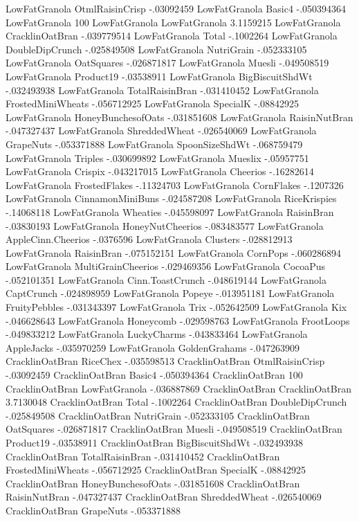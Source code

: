 LowFatGranola	OtmlRaisinCrisp	-.03092459
LowFatGranola	Basic4	-.050394364
LowFatGranola	100%
LowFatGranola	LowFatGranola	3.1159215
LowFatGranola	CracklinOatBran	-.039779514
LowFatGranola	Total	-.1002264
LowFatGranola	DoubleDipCrunch	-.025849508
LowFatGranola	NutriGrain	-.052333105
LowFatGranola	OatSquares	-.026871817
LowFatGranola	Muesli	-.049508519
LowFatGranola	Product19	-.03538911
LowFatGranola	BigBiscuitShdWt	-.032493938
LowFatGranola	TotalRaisinBran	-.031410452
LowFatGranola	FrostedMiniWheats	-.056712925
LowFatGranola	SpecialK	-.08842925
LowFatGranola	HoneyBunchesofOats	-.031851608
LowFatGranola	RaisinNutBran	-.047327437
LowFatGranola	ShreddedWheat	-.026540069
LowFatGranola	GrapeNuts	-.053371888
LowFatGranola	SpoonSizeShdWt	-.068759479
LowFatGranola	Triples	-.030699892
LowFatGranola	Mueslix	-.05957751
LowFatGranola	Crispix	-.043217015
LowFatGranola	Cheerios	-.16282614
LowFatGranola	FrostedFlakes	-.11324703
LowFatGranola	CornFlakes	-.1207326
LowFatGranola	CinnamonMiniBuns	-.024587208
LowFatGranola	RiceKrispies	-.14068118
LowFatGranola	Wheaties	-.045598097
LowFatGranola	RaisinBran	-.03830193
LowFatGranola	HoneyNutCheerios	-.083483577
LowFatGranola	AppleCinn.Cheerios	-.0376596
LowFatGranola	Clusters	-.028812913
LowFatGranola	RaisinBran	-.075152151
LowFatGranola	CornPops	-.060286894
LowFatGranola	MultiGrainCheerios	-.029469356
LowFatGranola	CocoaPus	-.052101351
LowFatGranola	Cinn.ToastCrunch	-.048619144
LowFatGranola	CaptCrunch	-.024898959
LowFatGranola	Popeye	-.013951181
LowFatGranola	FruityPebbles	-.031343397
LowFatGranola	Trix	-.052642509
LowFatGranola	Kix	-.046628643
LowFatGranola	Honeycomb	-.029598763
LowFatGranola	FrootLoops	-.049833212
LowFatGranola	LuckyCharms	-.043833464
LowFatGranola	AppleJacks	-.035970259
LowFatGranola	GoldenGrahams	-.047263909
CracklinOatBran	RiceChex	-.035598513
CracklinOatBran	OtmlRaisinCrisp	-.03092459
CracklinOatBran	Basic4	-.050394364
CracklinOatBran	100%
CracklinOatBran	LowFatGranola	-.036887869
CracklinOatBran	CracklinOatBran	3.7130048
CracklinOatBran	Total	-.1002264
CracklinOatBran	DoubleDipCrunch	-.025849508
CracklinOatBran	NutriGrain	-.052333105
CracklinOatBran	OatSquares	-.026871817
CracklinOatBran	Muesli	-.049508519
CracklinOatBran	Product19	-.03538911
CracklinOatBran	BigBiscuitShdWt	-.032493938
CracklinOatBran	TotalRaisinBran	-.031410452
CracklinOatBran	FrostedMiniWheats	-.056712925
CracklinOatBran	SpecialK	-.08842925
CracklinOatBran	HoneyBunchesofOats	-.031851608
CracklinOatBran	RaisinNutBran	-.047327437
CracklinOatBran	ShreddedWheat	-.026540069
CracklinOatBran	GrapeNuts	-.053371888
